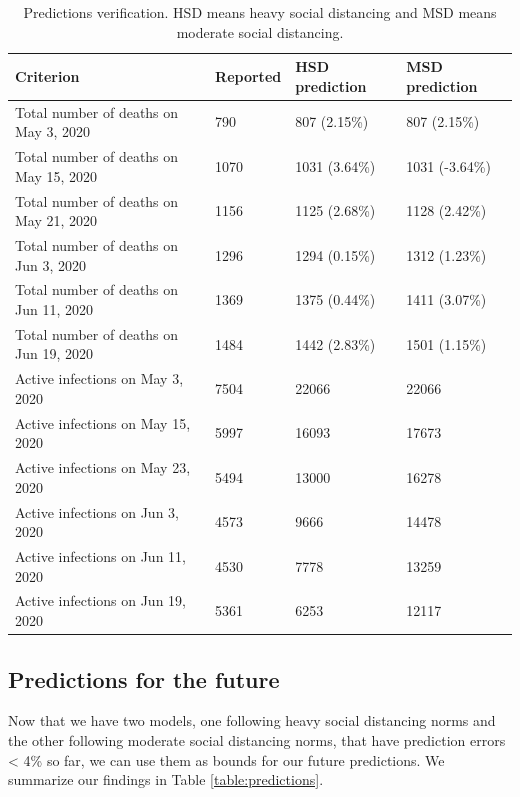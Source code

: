 \documentclass[11pt]{article}
\begin{document}
\begin{table}[H]
  \caption{Predictions verification. HSD means heavy social distancing and MSD means moderate social distancing.}
  \label{verify-table}
  \centering
  \begin{tabular}{llll}
    \toprule
    Criterion & Reported & HSD prediction & MSD prediction \\
    \midrule
    Total number of deaths on May 3, 2020 & 790 & 807 (2.15\%) & 807 (2.15\%) \\
    Total number of deaths on May 15, 2020 & 1070 & 1031 (3.64\%) & 1031 (-3.64\%) \\
    Total number of deaths on May 21, 2020 & 1156 & 1125 (2.68\%) & 1128 (2.42\%) \\
    Total number of deaths on Jun 3, 2020 & 1296 & 1294 (0.15\%) & 1312 (1.23\%) \\
    Total number of deaths on Jun 11, 2020 & 1369 & 1375 (0.44\%) & 1411 (3.07\%) \\
    Total number of deaths on Jun 19, 2020 & 1484 & 1442 (2.83\%) & 1501 (1.15\%) \\
    
    Active infections on May 3, 2020 & 7504 & 22066 & 22066 \\
    Active infections on May 15, 2020 & 5997 & 16093 & 17673 \\
    Active infections on May 23, 2020 & 5494 & 13000 & 16278 \\
    Active infections on Jun 3, 2020 & 4573 & 9666 & 14478 \\
    Active infections on Jun 11, 2020 & 4530 & 7778 & 13259 \\
    Active infections on Jun 19, 2020 & 5361 & 6253 & 12117 \\
    \bottomrule
  \end{tabular}
\end{table}

\subsection{Predictions for the future}

Now that we have two models, one following heavy social distancing norms and the other following moderate social distancing norms, that have prediction errors < 4\% so far, we can use them as bounds for our future predictions. We summarize our findings in Table \ref{table:predictions}.

\newpage
\end{document}
